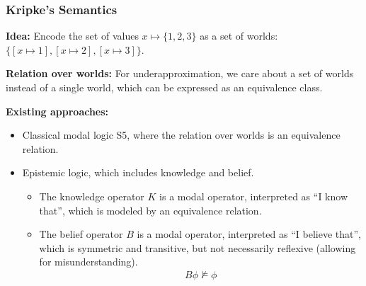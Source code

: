 \newcommand{\store}[1]{\langle #1 \rangle}

\begin{frame}[fragile]
    \frametitle{Kripke's Semantics}

\textbf{Idea:} Encode the set of values $x\mapsto \{1,2,3\}$ as a set of worlds: $\{ [x\mapsto 1], [x\mapsto 2], [x\mapsto 3] \}$.

\textbf{Relation over worlds:} For underapproximation, we care about a set of worlds instead of a single world, which can be expressed as an equivalence class.

\textbf{Existing approaches:} 
\begin{itemize}
    \item Classical modal logic S5, where the relation over worlds is an equivalence relation.
    \item Epistemic logic, which includes knowledge and belief.
    \begin{itemize}
        \item The knowledge operator $K$ is a modal operator, interpreted as ``I know that'', which is modeled by an equivalence relation.
        \item The belief operator $B$ is a modal operator, interpreted as ``I believe that'', which is symmetric and transitive, but not necessarily reflexive (allowing for misunderstanding).
        \begin{align*}
            B\phi \not\models \phi
        \end{align*}
    \end{itemize}
\end{itemize}
        
\end{frame}


